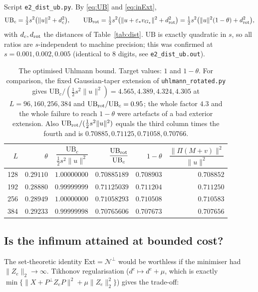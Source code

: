 \documentclass[11pt]{article}
\begin{document}
Script \texttt{e2\_dist\_ub.py}.  By \eqref{eq:UB} and \eqref{eq:inExt},
\begin{equation}
 \mathrm{UB}_c=\tfrac12 s^2\bigl(\|u\|^2+d_c^2\bigr),\qquad
 \mathrm{UB}_{\rm rot}=\tfrac12 s^2\bigl(\|u+\varepsilon_*v_{G_*}\|^2+d_{\rm rot}^2\bigr)
 =\tfrac12 s^2\bigl(\|u\|^2(1-\theta)+d^2_{\rm rot}\bigr),
\end{equation}
with $d_c,d_{\rm rot}$ the distances of Table~\ref{tab:dist}.  $\mathrm{UB}$ is exactly
quadratic in $s$, so all ratios are $s$-independent to machine precision; this was
confirmed at $s=0.001,0.002,0.005$ (identical to 8 digits, see \texttt{e2\_dist\_ub.out}).

\begin{table}[htbp]\centering\small
\begin{tabular}{r r r r r r}
\toprule
$L$&$\theta$&$\dfrac{\mathrm{UB}_c}{\frac12 s^2\|u\|^2}$&$\dfrac{\mathrm{UB}_{\rm rot}}{\mathrm{UB}_c}$&$1-\theta$&$\dfrac{\|\Pi(M+v)\|^2}{\|u\|^2}$\\[4pt]
\midrule
128&$0.29110$&$1.00000000$&$0.70885189$&$0.708903$&$0.708852$\\
192&$0.28880$&$0.99999999$&$0.71125039$&$0.711204$&$0.711250$\\
256&$0.28949$&$1.00000000$&$0.71058293$&$0.710508$&$0.710583$\\
384&$0.29233$&$0.99999998$&$0.70765606$&$0.707673$&$0.707656$\\
\bottomrule
\end{tabular}
\caption{The optimised Uhlmann bound.  Target values: $1$ and $1-\theta$.  For comparison,
the fixed Gaussian-taper extension of \texttt{uhlmann\_rotated.py} gives
$\mathrm{UB}_c/(\tfrac12s^2\|u\|^2)=4.565,4.389,4.324,4.305$ at $L=96,160,256,384$ and
$\mathrm{UB}_{\rm rot}/\mathrm{UB}_c=0.95$; the whole factor $4.3$ and the whole failure to
reach $1-\theta$ were artefacts of a bad exterior extension.  Also
$\mathrm{UB}_{\rm rot}/(\tfrac12 s^2\|u\|^2)$ equals the third column times the fourth and
is $0.70885,0.71125,0.71058,0.70766$.}
\label{tab:ub}
\end{table}

\subsection{Is the infimum attained at bounded cost?}
The set-theoretic identity $\mathrm{Ext}=\mathcal N^\perp$ would be worthless if the
minimiser had $\|Z_e\|_2\to\infty$.  Tikhonov regularisation ($d^c\mapsto d^c+\mu$, which
is exactly $\min\{\|X+P^\perp Z_eP\|^2+\mu\|Z_e\|_2^2\}$) gives the trade-off:
\end{document}
